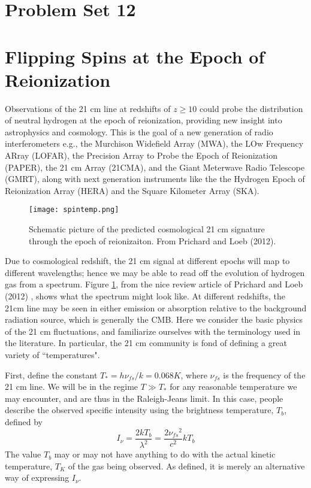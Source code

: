 \documentclass[11pt]{article}
\begin{document}
\pagestyle{empty}

\def\nufs{{\nu_{fs}}}
\section*{\centering Problem Set 12}

\section{Flipping Spins at the Epoch of Reionization}

Observations of the 21 cm line at redshifts of $z\ge10$ could probe the
distribution of neutral hydrogen at the epoch of reionization, providing new
insight into astrophysics and cosmology. This is the goal of a new generation
of radio interferometers e.g., the Murchison Widefield Array (MWA), the LOw
Frequency ARray (LOFAR), the Precision Array to Probe the Epoch of Reionization
(PAPER), the 21 cm Array (21CMA), and the Giant Meterwave Radio Telescope
(GMRT), along with next generation instruments like the 
the Hydrogen Epoch of Reionization Array (HERA) and the
Square Kilometer Array (SKA).

\begin{figure}[!ht]
\texttt{[image: spintemp.png]}
\caption{
Schematic picture of the predicted cosmological 21 cm signature through the
epoch of reionizaiton. From Prichard and Loeb (2012).
}\label{fig:spintemp}
\end{figure}

Due to cosmological redshift, the 21 cm signal at different epochs will map to
different wavelengths; hence we may be able to read off the evolution of
hydrogen gas from a spectrum. Figure \ref{fig:spintemp}, from the nice review article of
Prichard and Loeb (2012) , shows what the spectrum might look like. At
different redshifts, the 21cm line may be seen in either emission or absorption
relative to the background radiation source, which is generally the CMB. Here
we consider the basic physics of the 21 cm fluctuations, and familiarize
ourselves with the terminology used in the literature. In particular, the 21 cm
community is fond of defining a great variety of ``temperatures".

First, define the constant $T_*=h\nufs/k=0.068 K$, where $\nufs$ is the
frequency of the 21 cm line. We will be in the regime $T\gg T_*$ for any reasonable
temperature we may encounter, and are thus in the Raleigh-Jeans limit. In this
case, people describe the observed specific intensity using the brightness
temperature, $T_b$, defined by
\begin{equation}
I_\nu=\frac{2kT_b}{\lambda^2}=\frac{2\nufs^2}{c^2}kT_b
\end{equation}
The value $T_b$ may or may not have anything to do with the actual kinetic
temperature, $T_K$ of the gas being observed. As defined, it is merely an
alternative way of expressing $I_\nu$.
\end{document}
